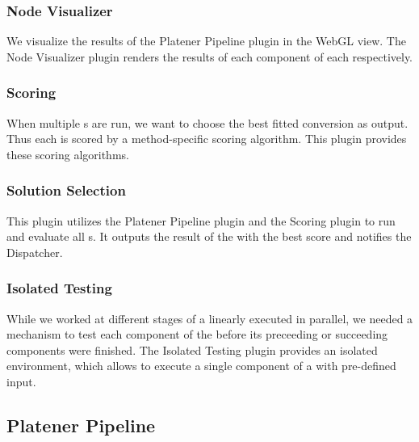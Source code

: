 \documentclass[../ClassicThesis.tex]{subfiles}
\begin{document}
\subsubsection{Node Visualizer}

We visualize the results of the Platener Pipeline plugin in the WebGL view. The
Node Visualizer plugin renders the results of each component of each
{\fabmethod} respectively.

\subsubsection{Scoring}

When multiple {\fabmethod}s are run, we want to choose the best fitted
conversion as output. Thus each {\fabmethod} is scored by a method-specific
scoring algorithm. This plugin provides these scoring algorithms.

\subsubsection{Solution Selection}

This plugin utilizes the Platener Pipeline plugin and the Scoring plugin to run
and evaluate all {\fabmethod}s. It outputs the result of the {\fabmethod} with
the best score and notifies the Dispatcher.

\subsubsection{Isolated Testing}

While we worked at different stages of a linearly executed {\fabmethod} in
parallel, we needed a mechanism to test each component of the {\fabmethod}
before its preceeding or succeeding components were finished. The Isolated
Testing plugin provides an isolated environment, which allows to execute a
single component of a {\fabmethod} with pre-defined input.



\subsection{Platener Pipeline}
\end{document}
